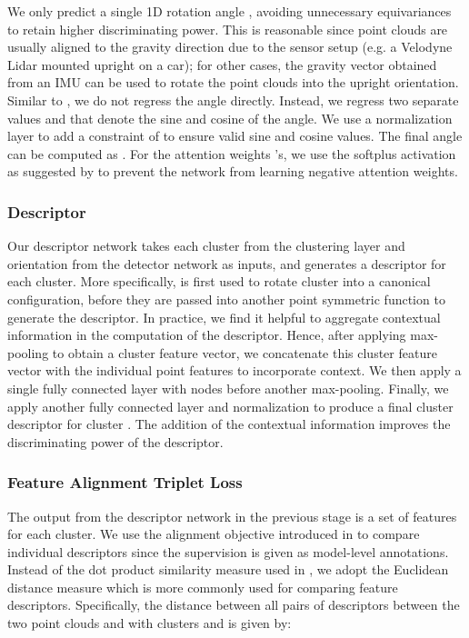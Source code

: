 \documentclass[runningheads]{llncs}
\begin{document}
We only predict a single 1D rotation angle , avoiding unnecessary equivariances to retain higher discriminating power. This is reasonable since point clouds are usually aligned to the gravity direction due to the sensor setup (e.g. a Velodyne Lidar mounted upright on a car); for other cases, the gravity vector obtained from an IMU can be used to rotate the point clouds into the upright orientation. Similar to \cite{yi2016orientation}, we do not regress the angle directly. Instead, we regress two separate values  and  that denote the sine and cosine of the angle. We use a  normalization layer to add a constraint of  to ensure valid sine and cosine values. The final angle can be computed as . 
For the attention weights 's, we use the softplus activation as suggested by \cite{delf} to prevent the network from learning negative attention weights.

\subsubsection{Descriptor}
Our descriptor network takes each cluster  from the clustering layer and orientation  from the detector network as inputs, and generates a descriptor  for each cluster.
More specifically,  is first used to rotate cluster  into a canonical configuration, before they are passed into another point symmetric function to generate the descriptor.
In practice, we find it helpful to aggregate contextual information in the computation of the descriptor. Hence, after applying max-pooling to obtain a cluster feature vector, we concatenate this cluster feature vector with the individual point features to incorporate context. We then apply a single fully connected layer with  nodes before another max-pooling. Finally, we apply another fully connected layer and  normalization to produce a final cluster descriptor  for cluster . The addition of the contextual information improves the discriminating power of the descriptor.

\subsubsection{Feature Alignment Triplet Loss}
The output from the descriptor network in the previous stage is a set of features  for each cluster. We use the alignment objective introduced in \cite{karpathy2015alignment} to compare individual descriptors since the supervision is given as model-level annotations. Instead of the dot product similarity measure used in \cite{karpathy2015alignment}, we adopt the Euclidean distance measure which is more commonly used for comparing feature descriptors. Specifically, the distance between all pairs of descriptors between the two point clouds
 and  with clusters  and  is given by: 
\end{document}
